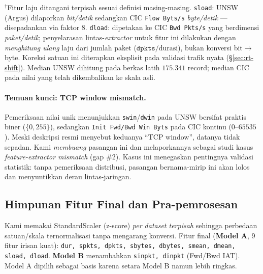 \documentclass[11pt,a4paper]{article}
\begin{document}
\begin{table}[t]
\vspace{0.4em}
\raggedright{\footnotesize $^\dagger$Fitur laju ditangani terpisah sesuai definisi
masing-masing. \texttt{sload}: UNSW (Argus) dilaporkan \emph{bit/detik} sedangkan
CIC \texttt{Flow Byts/s} \emph{byte/detik} --- disepadankan via faktor $8$.
\texttt{dload}: dipetakan ke CIC \texttt{Bwd Pkts/s} yang berdimensi
\emph{paket/detik}; penyelarasan lintas-\emph{extractor} untuk fitur ini dilakukan
dengan \emph{menghitung ulang} laju dari jumlah paket ($\mathtt{dpkts}/\text{durasi}$),
bukan konversi bit$\rightarrow$byte. Koreksi satuan ini diterapkan eksplisit pada
validasi trafik nyata (\S\ref{sec:rt-shift}). Median UNSW dihitung pada berkas latih
$175{.}341$ record; median CIC pada nilai yang telah dikembalikan ke skala asli.}
\end{table}

\paragraph{Temuan kunci: TCP window mismatch.} Pemeriksaan nilai unik
menunjukkan \texttt{swin}/\texttt{dwin} pada UNSW bersifat praktis biner
($\{0, 255\}$), sedangkan \texttt{Init Fwd/Bwd Win Byts} pada CIC kontinu
($0$--$65535$). Meski deskripsi resmi menyebut keduanya ``TCP window'', datanya
tidak sepadan. Kami \emph{membuang} pasangan ini dan melaporkannya sebagai studi
kasus \emph{feature-extractor mismatch} (gap \#2). Kasus ini menegaskan pentingnya
validasi statistik: tanpa pemeriksaan distribusi, pasangan bernama-mirip ini akan
lolos dan menyuntikkan derau lintas-jaringan.

\subsection{Himpunan Fitur Final dan Pra-pemrosesan}
Kami memakai StandardScaler (z-score) \emph{per dataset terpisah} sehingga
perbedaan satuan/skala ternormalisasi tanpa mengarang konversi. Fitur final
(\textbf{Model A}, 9 fitur irisan kuat): \texttt{dur, spkts, dpkts, sbytes,
dbytes, smean, dmean, sload, dload}. \textbf{Model B} menambahkan
\texttt{sinpkt, dinpkt} (Fwd/Bwd IAT). Model A dipilih sebagai basis karena
setara Model B namun lebih ringkas.
\end{document}
